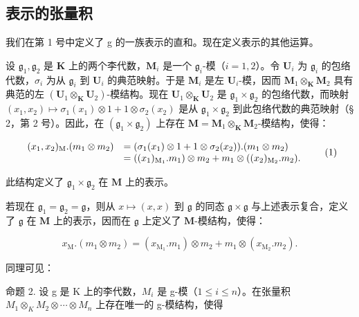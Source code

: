 \subsection{表示的张量积}

我们在第 1 号中定义了 g 的一族表示的直和。现在定义表示的其他运算。

设 \(\mathfrak{g}_1, \mathfrak{g}_2\) 是 \(\mathbf{K}\) 上的两个李代数，\(\mathbf{M}_i\) 是一个 \(\mathfrak{g}_i\)-模（\(i = 1, 2\)）。令 \(\mathbf{U}_i\) 为 \(\mathfrak{g}_i\) 的包络代数，\(\sigma_i\) 为从 \(\mathfrak{g}_i\) 到 \(\mathbf{U}_i\) 的典范映射。于是 \(\mathbf{M}_i\) 是左 \(\mathbf{U}_i\)-模，因而 \(\mathbf{M}_1 \otimes_{\mathbf{K}} \mathbf{M}_2\) 具有典范的左 \((\mathbf{U}_1 \otimes_{\mathbf{K}} \mathbf{U}_2)\)-模结构。现在 \(\mathbf{U}_1 \otimes_{\mathbf{K}} \mathbf{U}_2\) 是 \(\mathfrak{g}_1 \times \mathfrak{g}_2\) 的包络代数，而映射 \((x_1, x_2) \mapsto \sigma_1(x_1) \otimes 1 + 1 \otimes \sigma_2(x_2)\) 是从 \(\mathfrak{g}_1 \times \mathfrak{g}_2\) 到此包络代数的典范映射（§ 2，第 2 号）。因此，在 \((\mathfrak{g}_1 \times \mathfrak{g}_2)\) 上存在 \(\mathbf{M} = \mathbf{M}_1 \otimes_{\mathbf{K}} \mathbf{M}_2\)-模结构，使得：

\[
\begin{array}{r l} (x _ {1}, x _ {2}) _ {\mathrm{M}}. (m _ {1} \otimes m _ {2}) & = (\sigma_ {1} (x _ {1}) \otimes 1 + 1 \otimes \sigma_ {2} (x _ {2})) . (m _ {1} \otimes m _ {2}) \\ & = ((x _ {1}) _ {\mathrm{M} _ {1}}. m _ {1}) \otimes m _ {2} + m _ {1} \otimes ((x _ {2}) _ {\mathrm{M} _ {2}}. m _ {2}). \end{array}\tag{1}
\]

此结构定义了 \(\mathfrak{g}_1\times \mathfrak{g}_2\) 在 \(\mathbf{M}\) 上的表示。

若现在 \(\mathfrak{g}_1 = \mathfrak{g}_2 = \mathfrak{g}\)，则从 \(x \mapsto (x, x)\) 到 \(\mathfrak{g}\) 的同态 \(\mathfrak{g} \times \mathfrak{g}\) 与上述表示复合，定义了 \(\mathfrak{g}\) 在 \(\mathbf{M}\) 上的表示，因而在 \(\mathfrak{g}\) 上定义了 \(\mathbf{M}\)-模结构，使得：

\[
x _ {\mathrm{M}}. (m _ {1} \otimes m _ {2}) = (x _ {\mathrm{M} _ {1}}. m _ {1}) \otimes m _ {2} + m _ {1} \otimes (x _ {\mathrm{M} _ {2}}. m _ {2}).\tag{2}
\]

同理可见：

命题 2. 设 g 是 K 上的李代数，\(M_{i}\) 是 g-模（\(1 \leqslant i \leqslant n\)）。在张量积 \(M_{1} \otimes_{K} M_{2} \otimes \cdots \otimes M_{n}\) 上存在唯一的 g-模结构，使得

